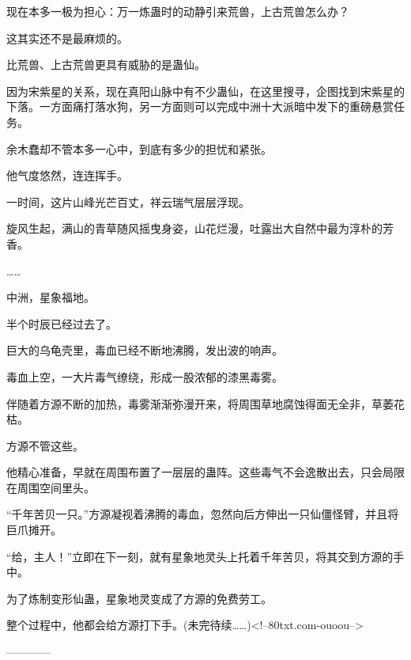 \begin{this_body}
现在本多一极为担心：万一炼蛊时的动静引来荒兽，上古荒兽怎么办？

这其实还不是最麻烦的。

比荒兽、上古荒兽更具有威胁的是蛊仙。

因为宋紫星的关系，现在真阳山脉中有不少蛊仙，在这里搜寻，企图找到宋紫星的下落。一方面痛打落水狗，另一方面则可以完成中洲十大派暗中发下的重磅悬赏任务。

余木蠢却不管本多一心中，到底有多少的担忧和紧张。

他气度悠然，连连挥手。

一时间，这片山峰光芒百丈，祥云瑞气层层浮现。

旋风生起，满山的青草随风摇曳身姿，山花烂漫，吐露出大自然中最为淳朴的芳香。

……

中洲，星象福地。

半个时辰已经过去了。

巨大的乌龟壳里，毒血已经不断地沸腾，发出波的响声。

毒血上空，一大片毒气缭绕，形成一股浓郁的漆黑毒雾。

伴随着方源不断的加热，毒雾渐渐弥漫开来，将周围草地腐蚀得面无全非，草萎花枯。

方源不管这些。

他精心准备，早就在周围布置了一层层的蛊阵。这些毒气不会逸散出去，只会局限在周围空间里头。

“千年苦贝一只。”方源凝视着沸腾的毒血，忽然向后方伸出一只仙僵怪臂，并且将巨爪摊开。

“给，主人！”立即在下一刻，就有星象地灵头上托着千年苦贝，将其交到方源的手中。

为了炼制变形仙蛊，星象地灵变成了方源的免费劳工。

整个过程中，他都会给方源打下手。(未完待续……)<!--80txt.com-ouoou-->

------------

\end{this_body}

